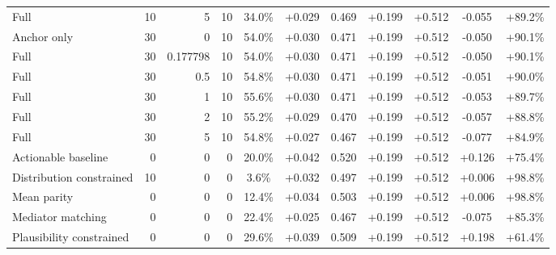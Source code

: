 \begin{table}[htbp]
\begin{tabular}{lrrrccccccc}
Full & 10 & 5 & 10 & 34.0\% & +0.029 & 0.469 & +0.199 & +0.512 & -0.055 & +89.2\% \\
Anchor only & 30 & 0 & 10 & 54.0\% & +0.030 & 0.471 & +0.199 & +0.512 & -0.050 & +90.1\% \\
Full & 30 & 0.177798 & 10 & 54.0\% & +0.030 & 0.471 & +0.199 & +0.512 & -0.050 & +90.1\% \\
Full & 30 & 0.5 & 10 & 54.8\% & +0.030 & 0.471 & +0.199 & +0.512 & -0.051 & +90.0\% \\
Full & 30 & 1 & 10 & 55.6\% & +0.030 & 0.471 & +0.199 & +0.512 & -0.053 & +89.7\% \\
Full & 30 & 2 & 10 & 55.2\% & +0.029 & 0.470 & +0.199 & +0.512 & -0.057 & +88.8\% \\
Full & 30 & 5 & 10 & 54.8\% & +0.027 & 0.467 & +0.199 & +0.512 & -0.077 & +84.9\% \\
Actionable baseline & 0 & 0 & 0 & 20.0\% & +0.042 & 0.520 & +0.199 & +0.512 & +0.126 & +75.4\% \\
Distribution constrained & 10 & 0 & 0 & 3.6\% & +0.032 & 0.497 & +0.199 & +0.512 & +0.006 & +98.8\% \\
Mean parity & 0 & 0 & 0 & 12.4\% & +0.034 & 0.503 & +0.199 & +0.512 & +0.006 & +98.8\% \\
Mediator matching & 0 & 0 & 0 & 22.4\% & +0.025 & 0.467 & +0.199 & +0.512 & -0.075 & +85.3\% \\
Plausibility constrained & 0 & 0 & 0 & 29.6\% & +0.039 & 0.509 & +0.199 & +0.512 & +0.198 & +61.4\% \\
\bottomrule
\end{tabular}
\end{table}